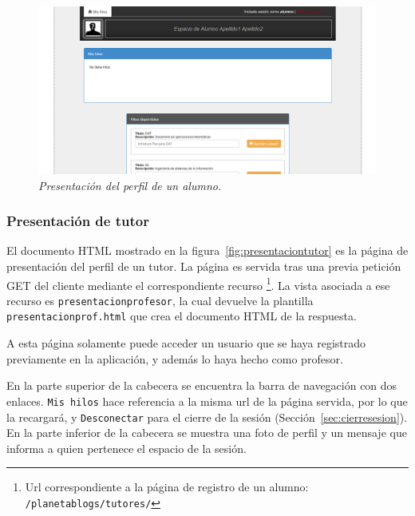 \documentclass[a4paper, 12pt]{book}
\begin{document}
\begin{figure}
  \centering
  \includegraphics[width=17cm, keepaspectratio]{imagenes/PresentacionAlumno}
  \caption{\textit{Presentaci\'on del perfil de un alumno.}}
  \label{fig:presentacionalumno}
\end{figure}


\subsubsection{Presentaci\'on de tutor}
\label{sec:presentaciontutor}
El documento HTML mostrado en la figura~\ref{fig:presentaciontutor} es la p\'agina de presentaci\'on del perfil de un tutor. La p\'agina es servida 
tras una previa petici\'on GET del cliente mediante el correspondiente recurso \footnote{Url correspondiente a la p\'agina de registro de un alumno: 
\texttt{/planetablogs/tutores/}}. La vista asociada a ese recurso es \texttt{presentacionprofesor}, la cual devuelve la plantilla 
\texttt{presentacionprof.html} que crea el documento HTML de la respuesta.

A esta p\'agina solamente puede acceder un usuario que se haya registrado previamente en la aplicaci\'on, y adem\'as lo haya hecho como profesor.

En la parte superior de la cabecera se encuentra la barra de navegaci\'on con dos enlaces. \texttt{Mis hilos} hace referencia a la misma url de la 
p\'agina servida, por lo que la recargar\'a, y \texttt{Desconectar} para el cierre de la sesi\'on (Secci\'on~\ref{sec:cierresesion}). En la parte inferior 
de la cabecera se muestra una foto de perfil y un mensaje que informa a quien pertenece el espacio de la sesi\'on.
\end{document}
